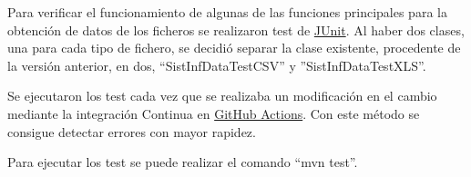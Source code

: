 Para verificar el funcionamiento de algunas de las funciones principales para la obtención de datos de los ficheros se realizaron test de \href{https://junit.org/junit5/}{JUnit}. Al haber dos clases, una para cada tipo de fichero, se decidió separar la clase existente, procedente de la versión anterior, en dos, ``SistInfDataTestCSV'' y ''SistInfDataTestXLS''. 

Se ejecutaron los test cada vez que se realizaba un modificación en el cambio mediante la integración Continua en \href{https://github.com/dbo1001/Gestor-TFG-2021/actions}{GitHub Actions}. Con este método se consigue detectar errores con mayor rapidez.

Para ejecutar los test se puede realizar el comando ``mvn test''.